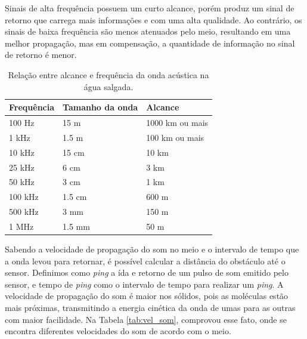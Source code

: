 Sinais de alta frequência possuem um curto alcance, porém produz um sinal de retorno que carrega mais informações e com uma alta qualidade. Ao contrário, os sinais de baixa frequência são menos atenuados pelo meio, resultando em uma melhor propagação, mas em compensação, a quantidade de informação no sinal de retorno é menor.

\begin{table}[H]
    \centering
    \caption{Relação entre alcance e frequência da onda acústica na água salgada.}
    \label{tab:freq-acustica}
    \begin{tabular}{@{}lll@{}}
    \toprule
        Frequência & Tamanho da onda & Alcance \\ \midrule
        100 Hz & 15 m & 1000 km ou mais \\
        1 kHz & 1.5 m & 100 km ou mais \\
        10 kHz & 15 cm & 10 km \\
        25 kHz & 6 cm & 3 km \\
        50 kHz & 3 cm & 1 km \\
        100 kHz & 1.5 cm & 600 m \\
        500 kHz & 3 mm & 150 m \\
        1 MHz & 1.5 mm & 50 m \\ \bottomrule
    \end{tabular}
\end{table}

Sabendo a velocidade de propagação do som no meio e o intervalo de tempo que a onda levou para retornar, é possível calcular a distância do obstáculo até o sensor. 
Definimos como \textit{ping} a ída e retorno de um pulso de som emitido pelo sensor, e tempo de \textit{ping} como o intervalo de tempo para realizar um \textit{ping}. 
A velocidade de propagação do som é maior nos sólidos, pois as moléculas estão mais próximas, transmitindo a energia cinética da onda de umas para as outras com maior facilidade. 
Na Tabela \ref{tab:vel_som}, \cite{halliday2008fundamentals} comprovou esse fato, onde se encontra diferentes velocidades do som de acordo com o meio.

